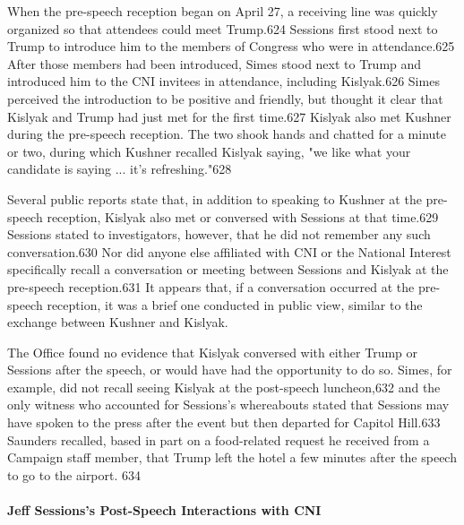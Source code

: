 When the pre-speech reception began on April 27, a receiving line was quickly organized so that attendees could meet Trump.624 Sessions first stood next to Trump to introduce him to the members of Congress who were in attendance.625 After those members had been introduced, Simes stood next to Trump and introduced him to the CNI invitees in attendance,  including Kislyak.626 Simes perceived the introduction to be positive and friendly, but thought it  clear that Kislyak and Trump had just met for the first time.627 Kislyak also met Kushner during the pre-speech reception. The two shook hands and chatted for a  minute or two, during which Kushner recalled Kislyak saying, "we like what your candidate is saying ... it's refreshing."628

Several public reports state that, in addition to speaking to Kushner at the pre-speech reception, Kislyak also met or conversed with Sessions at that time.629 Sessions stated to investigators, however, that he did not remember any such conversation.630 Nor did anyone else affiliated with CNI or the National Interest specifically recall a  conversation or meeting between Sessions and Kislyak at the pre-speech reception.631 It appears that,  if a conversation occurred at the pre-speech reception, it  was a  brief one conducted in public view,  similar to the exchange between Kushner and Kislyak.

The Office found no evidence that Kislyak conversed with either Trump or Sessions after the speech, or would have had the opportunity to do so. Simes, for example, did not recall seeing Kislyak at the post-speech luncheon,632 and the only witness who accounted for Sessions's whereabouts stated that Sessions may have spoken to the press after the event but then departed for Capitol Hill.633 Saunders recalled, based in part on a food-related request he received from a Campaign staff member, that Trump left the hotel a  few minutes after the speech to go to the airport. 634

\paragraph{Jeff Sessions's Post-Speech Interactions with CNI}

